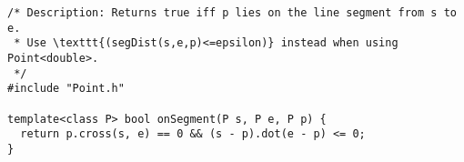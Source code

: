 \begin{verbatim}
/* Description: Returns true iff p lies on the line segment from s to e.
 * Use \texttt{(segDist(s,e,p)<=epsilon)} instead when using Point<double>.
 */
#include "Point.h"

template<class P> bool onSegment(P s, P e, P p) {
  return p.cross(s, e) == 0 && (s - p).dot(e - p) <= 0;
}
\end{verbatim}
